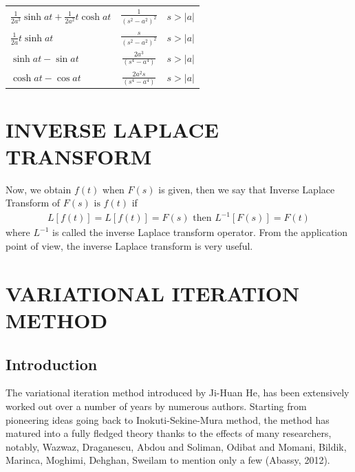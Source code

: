 \documentclass[12pt]{report}
\begin{document}
\begin{center}
\begin{tabular}{llcccc}
		\multicolumn{2}{l}{$\displaystyle \frac{1}{2a^3} \sinh at + \frac{1}{2a^2} t \cosh at$} & \multicolumn{2}{c}{$\displaystyle \frac{1}{(s^2 - a^2)^2 }$} & \multicolumn{2}{c}{$s > |a|$} \\

		\multicolumn{2}{l}{$\displaystyle \frac{1}{2a}t \sinh at$} & \multicolumn{2}{c}{$\displaystyle \frac{s}{(s^2 - a^2)^2 }$} & \multicolumn{2}{c}{$s > |a|$} \\


		\multicolumn{2}{l}{$\displaystyle \sinh at - \sin at $} & \multicolumn{2}{c}{$\displaystyle \frac{2a^3}{(s^4 - a^4) }$} & \multicolumn{2}{c}{$s > |a|$} \\


\multicolumn{2}{l}{$\displaystyle \cosh at - \cos at $} & \multicolumn{2}{c}{$\displaystyle \frac{2a^{2}s}{(s^4 - a^4) }$} & \multicolumn{2}{c}{$s > |a|$} \\



	\end{tabular}
	
\end{center}
\section{INVERSE LAPLACE TRANSFORM}
\qquad Now, we obtain $f(t)$ when $F(s)$ is given, then we say that Inverse Laplace Transform of $F(s) \mbox{ is } f(t)$ if
\begin{align*}
L[f(t)]=L[f(t)]=F(s) \mbox{ then } L^{-1}[F(s)]=F(t)
\end{align*}
where $L^{-1}$ is called the inverse Laplace transform operator. From the application point of view, the inverse Laplace transform is very useful.


\section{VARIATIONAL ITERATION METHOD}
\subsection{Introduction}
The variational iteration method introduced by Ji-Huan He, has been extensively worked out over a number of years by numerous authors. Starting from pioneering ideas going back to Inokuti-Sekine-Mura method, the method has matured into a fully fledged theory thanks to the effects of many researchers, notably, Wazwaz, Draganescu, Abdou and Soliman, Odibat and Momani, Bildik, Marinca, Moghimi, Dehghan, Sweilam to mention only a few (Abassy, 2012).\\
\end{document}
